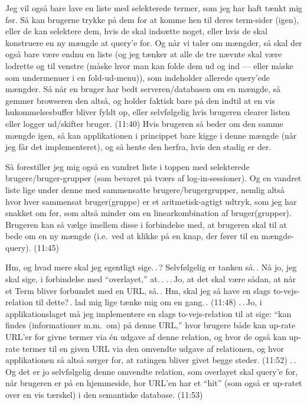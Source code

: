 \documentclass{report}
\begin{document}
Jeg vil også bare lave en liste med selekterede termer, som jeg har haft tænkt mig før. Så kan brugerne trykke på dem for at komme hen til deres term-sider (igen), eller de kan selektere dem, hvis de skal indsætte noget, eller hvis de skal konstruere en ny mængde at query'e for. Og når vi taler om mængder, så skal der også bare være endnu en liste (og jeg tænker at alle de tre nævnte skal være lodrette og til venstre (måske hvor man kan folde dem ud og ind --- eller måske som undermenuer i en fold-ud-menu)), som indeholder allerede query'ede mængder. Så når en bruger har bedt serveren/databasen om en mængde, så gemmer browseren den altså, og holder faktisk bare på den indtil at en vis hukommelsesbuffer bliver fyldt op, eller selvfølgelig hvis brugeren clearer listen eller logger ud/skifter bruger. (11:40) Hvis brugeren så beder om den samme mængde igen, så kan applikationen i princippet bare kigge i denne mængde (når jeg får det implementeret), og så hente den herfra, hvis den stadig er der. 

Så forestiller jeg mig også en vandret liste i toppen med selekterede brugere/bruger-grupper (som bevaret på tværs af log-in-sessioner). Og en vandret liste lige under denne med sammensatte brugere/brugergrupper, nemlig altså hvor hver sammensat bruger(gruppe) er et aritmetisk-agtigt udtryk, som jeg har snakket om før, som altså minder om en linearkombination af bruger(grupper). Brugeren kan så vælge imellem disse i forbindelse med, at brugeren skal til at bede om en ny mængde (i.e.\ ved at klikke på en knap, der fører til en mængde-query). (11:45)

Hm, og hvad mere skal jeg egentligt sige.\,.\,? Selvfølgelig er tanken så.\,. Nå jo, jeg skal sige, i forbindelse med ``overlayet,'' at.\,. .\,.\,Jo, at det skal være sådan, at når et Term bliver forbundet med en URL, så.\,. Hm, skal jeg så have en slags to-vejs-relation til dette?\,. lad mig lige tænke mig om en gang.\,. (11:48) .\,.\,Jo, i applikationslaget må jeg implementere en slags to-vejs-relation til at sige: ``kan findes (informationer m.m.\ om) på denne URL,'' hvor brugere både kan up-rate URL'er for givne termer via én udgave af denne relation, og hvor de også kan up-rate termer til en given URL via den omvendte udgave af relationen, og hvor applikationen så altså sørger for, at ratingen bliver givet begge steder. (11:52) .\,.\,Og det er jo selvfølgelig denne omvendte relation, som overlayet skal query'e for, når brugeren er på en hjemmeside, hor URL'en har et ``hit'' (som også er up-ratet over en vis tærskel) i den semantiske database. (11:53)
\end{document}
